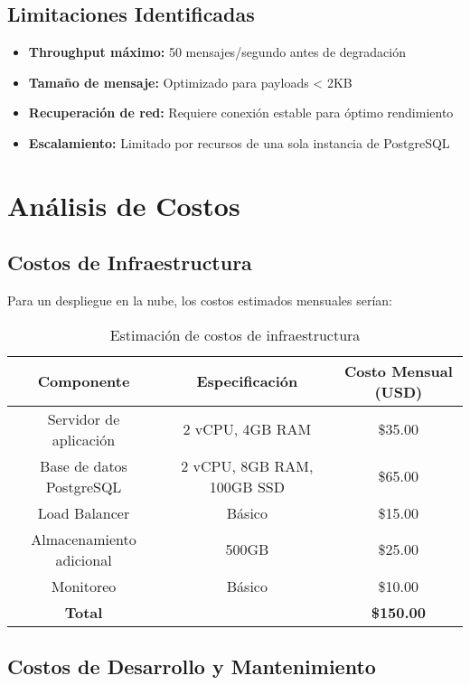 \subsection{Limitaciones Identificadas}

\begin{itemize}
    \item \textbf{Throughput máximo:} 50 mensajes/segundo antes de degradación
    \item \textbf{Tamaño de mensaje:} Optimizado para payloads < 2KB
    \item \textbf{Recuperación de red:} Requiere conexión estable para óptimo rendimiento
    \item \textbf{Escalamiento:} Limitado por recursos de una sola instancia de PostgreSQL
\end{itemize}

\section{Análisis de Costos}

\subsection{Costos de Infraestructura}

Para un despliegue en la nube, los costos estimados mensuales serían:

\begin{table}[H]
\centering
\begin{tabular}{|c|c|c|}
\hline
\textbf{Componente} & \textbf{Especificación} & \textbf{Costo Mensual (USD)} \\
\hline
Servidor de aplicación & 2 vCPU, 4GB RAM & \$35.00 \\
\hline
Base de datos PostgreSQL & 2 vCPU, 8GB RAM, 100GB SSD & \$65.00 \\
\hline
Load Balancer & Básico & \$15.00 \\
\hline
Almacenamiento adicional & 500GB & \$25.00 \\
\hline
Monitoreo & Básico & \$10.00 \\
\hline
\textbf{Total} & & \textbf{\$150.00} \\
\hline
\end{tabular}
\caption{Estimación de costos de infraestructura}
\label{tab:costos}
\end{table}

\subsection{Costos de Desarrollo y Mantenimiento}

